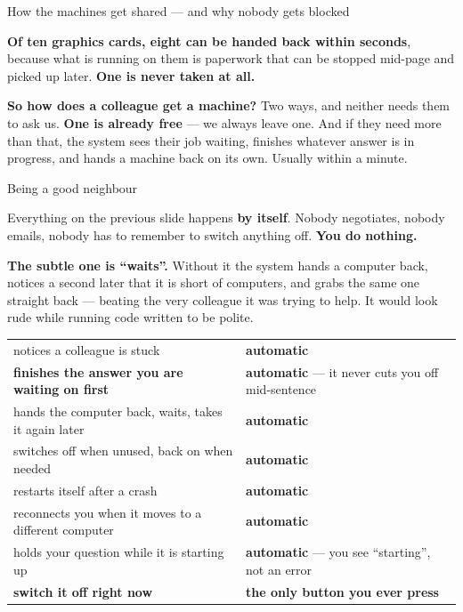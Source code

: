 \documentclass[aspectratio=169]{beamer}
\newcommand{\keybox}[1]{%
  \begin{center}
  \colorbox{black!8}{\parbox{0.92\textwidth}{\centering #1}}
  \end{center}}
\begin{document}
\begin{frame}{How the machines get shared --- and why nobody gets blocked}
\vspace{0.4em}
\keybox{\textbf{Of ten graphics cards, eight can be handed back within seconds}, because what is
running on them is paperwork that can be stopped mid-page and picked up later. \textbf{One is never
taken at all.}}

\vspace{0.5em}
{\small \textbf{So how does a colleague get a machine?} Two ways, and neither needs them to ask us.
\textbf{One is already free} --- we always leave one. And if they need more than that, the system
sees their job waiting, finishes whatever answer is in progress, and hands a machine back on its
own. Usually within a minute.}

\end{frame}

\begin{frame}{Being a good neighbour}

{\small Everything on the previous slide happens \textbf{by itself}. Nobody negotiates, nobody
emails, nobody has to remember to switch anything off. \textbf{You do nothing.}}

\vspace{0.4em}
\vspace{0.5em}
\keybox{\small \textbf{The subtle one is ``waits''.} Without it the system hands a computer back,
notices a second later that it is short of computers, and grabs the same one straight back ---
beating the very colleague it was trying to help. It would look rude while running code written to
be polite.}

\vspace{0.4em}
\begin{center}
\scriptsize
\begin{tabular}{@{}ll@{}}
\toprule
notices a colleague is stuck & \textbf{automatic} \\
\textbf{finishes the answer you are waiting on first} & \textbf{automatic} --- it never cuts you off mid-sentence \\
hands the computer back, waits, takes it again later & \textbf{automatic} \\
switches off when unused, back on when needed & \textbf{automatic} \\
restarts itself after a crash & \textbf{automatic} \\
reconnects you when it moves to a different computer & \textbf{automatic} \\
holds your question while it is starting up & \textbf{automatic} --- you see ``starting'', not an error \\
\midrule
\textbf{switch it off right now} & \textbf{the only button you ever press} \\
\bottomrule
\end{tabular}
\end{center}

\end{frame}
\end{document}
